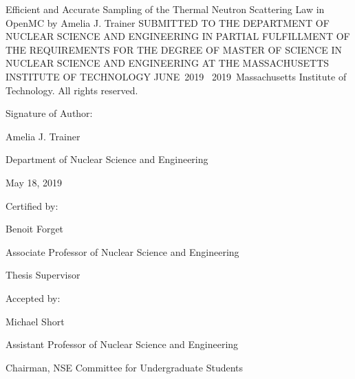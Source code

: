 \documentclass{article}
\newcommand{\thesis}{Efficient and Accurate Sampling of the Thermal Neutron Scattering Law in OpenMC}
\newcommand{\me}{Amelia J. Trainer}
\newcommand{\gradMonth}{JUNE}%
\newcommand{\gradYear}{2019}
\newcommand{\signDate}{May 18, 2019}
\newcommand{\advisorName}{Benoit Forget}
\newcommand{\advisorTitle}{Associate Professor of Nuclear Science and Engineering}
\newcommand{\ugChairName}{Michael Short}
\newcommand{\ugChairTitle}{Assistant Professor of Nuclear Science and Engineering}
\newcommand{\ugChairChair}{Chairman, NSE Committee for Undergraduate Students}
\newcommand{\copyStatement}{{\textcopyright \ \gradYear \ Massachusetts Institute of Technology. All rights reserved.}}
\begin{document}
\setcounter{page}{1} %
\begin{titlepage}
    \begin{center}
    {\Large{\thesis}}
    \vfill
    {by}
    \vfill
    {\me}
    \vfill
    {SUBMITTED TO THE DEPARTMENT OF NUCLEAR SCIENCE AND ENGINEERING IN PARTIAL FULFILLMENT OF THE REQUIREMENTS FOR THE DEGREE OF}
    \vfill
    {MASTER OF SCIENCE IN NUCLEAR SCIENCE AND ENGINEERING}
    \vfill
    {AT THE}
    \vfill
    {MASSACHUSETTS INSTITUTE OF TECHNOLOGY}
    \vfill
    {\gradMonth\ \gradYear}
    \vfill
	\copyStatement
    \end{center}
    
    
    \begin{flushleft}
    {Signature of Author:\hrulefill}
    \end{flushleft}
    
    \begin{flushright}
    {\me }
    
    {Department of Nuclear Science and Engineering}
    
    {\signDate }
    \end{flushright}
    \vfill

    \begin{flushleft}
    {Certified by:\hrulefill}
    \end{flushleft}
    
    \begin{flushright}
    {\advisorName}
    
    {\advisorTitle}
    
    {Thesis Supervisor}
    
    \end{flushright}
    \vfill

\begin{flushleft}
    {Accepted by:\hrulefill}
    \end{flushleft}
    
    \begin{flushright}
	{\ugChairName}
	
	{\ugChairTitle}
	
	{\ugChairChair}
    \end{flushright}
    
\end{titlepage}
\blankpage
\end{document}
